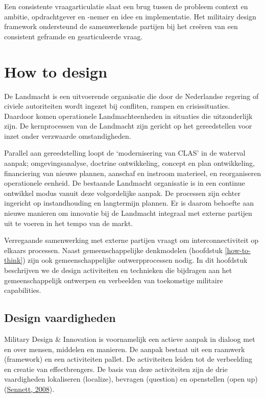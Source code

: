 \documentclass[
]{book}
\begin{document}
Een consistente vraagarticulatie slaat een brug tussen de probleem context en ambitie, opdrachtgever en -nemer en idee en implementatie. Het militairy design framework ondersteund de samenwerkende partijen bij het creëren van een consistent geframde en gearticuleerde vraag.

\hypertarget{how-to-design}{%
\chapter{How to design}\label{how-to-design}}

De Landmacht is een uitvoerende organisatie die door de Nederlandse regering of civiele autoriteiten wordt ingezet bij confliten, rampen en crisissituaties. Daardoor komen operationele Landmachteenheden in situaties die uitzonderlijk zijn. De kernprocessen van de Landmacht zijn gericht op het gereedstellen voor inzet onder verzwaarde omstandigheden.

Parallel aan gereedstelling loopt de `modernisering van CLAS' in de waterval aanpak; omgevingsanalyse, doctrine ontwikkeling, concept en plan ontwikkeling, financiering van nieuwe plannen, aanschaf en instroom materieel, en reorganiseren operationele eenheid. De bestaande Landmacht organisatie is in een continue ontwikkel modus vanuit deze volgordelijke aanpak. De processen zijn echter ingericht op instandhouding en langtermijn plannen. Er is daarom behoefte aan nieuwe manieren om innovatie bij de Landmacht integraal met externe partijen uit te voeren in het tempo van de markt.

Verregaande samenwerking met externe partijen vraagt om interconnectiviteit op elkaars processen. Naast gemeenschappelijke denkmodelen (hoofdstuk \ref{how-to-think}) zijn ook gemeenschappelijke ontwerpprocessen nodig. In dit hoofdstuk beschrijven we de design activiteiten en technieken die bijdragen aan het gemeenschappelijk ontwerpen en verbeelden van toekomstige militaire capabilities.

\hypertarget{design-vaardigheden}{%
\section{Design vaardigheden}\label{design-vaardigheden}}

Military Design \& Innovation is voornamelijk een actieve aanpak in dialoog met en over mensen, middelen en manieren. De aanpak bestaat uit een raamwerk (framework) en een activiteiten pallet. De activiteiten leiden tot de verbeelding en creatie van effectbrengers. De basis van deze activiteiten zijn de drie vaardigheden lokaliseren (localize), bevragen (question) en openstellen (open up) (\protect\hyperlink{ref-sennett_craftsman_2008}{Sennett, 2008}).
\end{document}
